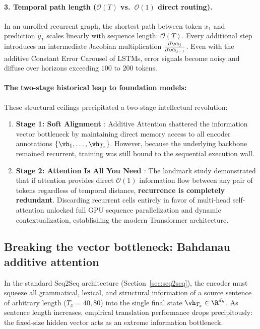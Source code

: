 \documentclass[../../main.tex]{subfiles}
\begin{document}
\paragraph{3. Temporal path length ($\mathcal{O}(T)$ vs.~$\mathcal{O}(1)$ direct routing).}
In an unrolled recurrent graph, the shortest path between token $x_1$ and prediction $y_T$ scales linearly with sequence length: $\mathcal{O}(T)$. Every additional step introduces an intermediate Jacobian multiplication $\frac{\partial \vh_j}{\partial \vh_{j-1}}$. Even with the additive Constant Error Carousel of LSTMs, error signals become noisy and diffuse over horizons exceeding $100$ to $200$ tokens.

\paragraph{The two-stage historical leap to foundation models:}
These structural ceilings precipitated a two-stage intellectual revolution:
\begin{enumerate}
    \item \textbf{Stage 1: Soft Alignment \cite{bahdanau2014}}: Additive Attention shattered the information vector bottleneck by maintaining direct memory access to all encoder annotations $\{\vh_1, \dots, \vh_{T_x}\}$. However, because the underlying backbone remained recurrent, training was still bound to the sequential execution wall.
    \item \textbf{Stage 2: Attention Is All You Need \cite{vaswani2017}}: The landmark study demonstrated that if attention provides direct $\mathcal{O}(1)$ information flow between any pair of tokens regardless of temporal distance, \textbf{recurrence is completely redundant}. Discarding recurrent cells entirely in favor of multi-head self-attention unlocked full GPU sequence parallelization and dynamic contextualization, establishing the modern Transformer architecture.
\end{enumerate}

\subsection{Breaking the vector bottleneck: Bahdanau additive attention}
\label{sec:bahdanau_attention}

In the standard Seq2Seq architecture (Section~\ref{sec:seq2seq}), the encoder must squeeze all grammatical, lexical, and structural information of a source sentence of arbitrary length ($T_x = 40, 80$) into the single final state $\vh_{T_x} \in \R^{d_h}$. As sentence length increases, empirical translation performance drops precipitously: the fixed-size hidden vector acts as an extreme information bottleneck.
\end{document}
